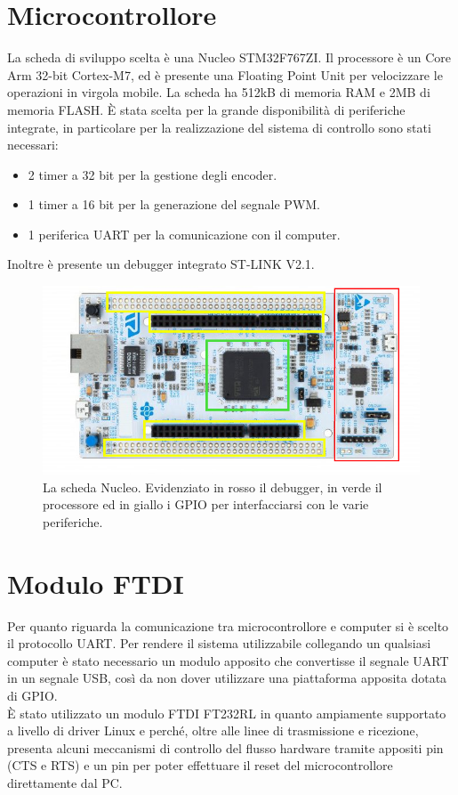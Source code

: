\section{Microcontrollore}
La scheda di sviluppo scelta è una Nucleo STM32F767ZI.
Il processore è un Core Arm 32-bit Cortex-M7, ed è presente una Floating Point Unit per velocizzare le operazioni in virgola mobile.
La scheda ha 512kB di memoria RAM e 2MB di memoria FLASH.
È stata scelta per la grande disponibilità di periferiche integrate, in particolare per la realizzazione del sistema di controllo sono stati necessari: 
\begin{itemize}
    \item 2 timer a 32 bit per la gestione degli encoder.
    \item 1 timer a 16 bit per la generazione del segnale PWM.
    \item 1 periferica UART per la comunicazione con il computer.
\end{itemize}
Inoltre è presente un debugger integrato ST-LINK V2.1.

\begin{figure}[H]
\centering
\includegraphics[scale=0.65]{images/nucleo.png}
\caption{La scheda Nucleo. Evidenziato in rosso il debugger, in verde il processore ed in giallo i GPIO per interfacciarsi con le varie periferiche.}
\end{figure}

\section{Modulo FTDI}
Per quanto riguarda la comunicazione tra microcontrollore e computer si è scelto il protocollo UART. 
Per rendere il sistema utilizzabile collegando un qualsiasi computer è stato necessario un modulo apposito che convertisse il segnale UART in un segnale USB, così da non dover utilizzare una piattaforma apposita dotata di GPIO. \\
È stato utilizzato un modulo FTDI FT232RL in quanto ampiamente supportato a livello di driver Linux e perché, oltre alle linee di trasmissione e ricezione, presenta alcuni meccanismi di controllo del flusso hardware tramite appositi pin (CTS e RTS) e un pin per poter effettuare il reset del microcontrollore direttamente dal PC.

